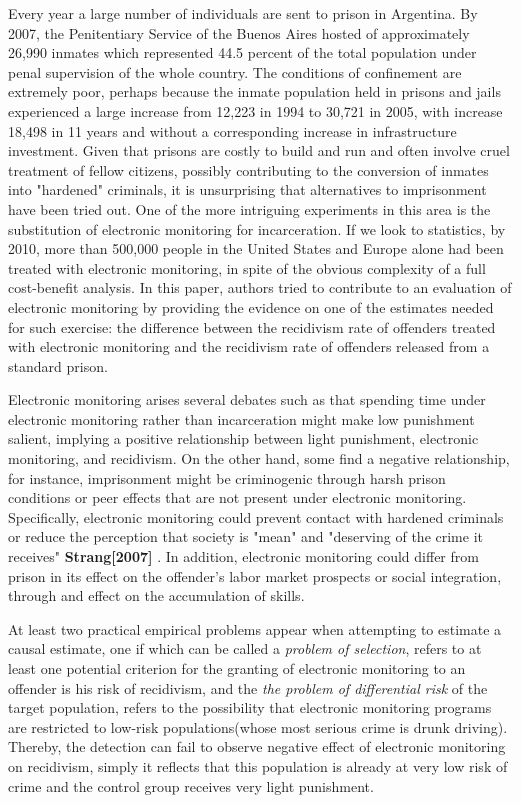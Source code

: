 \documentclass[a4paper,12pt]{article}
\begin{document}
Every year a large number of individuals are sent to prison in Argentina. By 2007, the Penitentiary Service of the Buenos Aires hosted of approximately 26,990 inmates which represented 44.5 percent of the total population under penal supervision of the whole country. The conditions of confinement are extremely poor, perhaps because the inmate population held in prisons and jails experienced a large increase from 12,223 in 1994 to 30,721 in 2005, with increase 18,498 in 11 years and without a corresponding increase in infrastructure investment. Given that prisons are costly to build and run and often involve cruel treatment of fellow citizens, possibly contributing to the conversion of inmates into "hardened" criminals, it is unsurprising that alternatives to imprisonment have been tried out. One of the more intriguing experiments in this area is the substitution of electronic monitoring for incarceration. If we look to statistics, by 2010, more than 500,000 people in the United States and Europe alone had been treated with electronic monitoring, in spite of the obvious complexity of a full cost-benefit analysis. In this paper, authors tried to contribute to an evaluation of electronic monitoring by providing the evidence on one of the estimates needed for such exercise: the difference between the recidivism rate of offenders treated with electronic monitoring and the recidivism rate of offenders released from a standard prison. 

Electronic monitoring arises several debates such as that spending time under electronic monitoring rather than incarceration might make low punishment salient, implying a positive relationship between light punishment, electronic monitoring, and recidivism. On the other hand, some find a negative relationship, for instance, imprisonment might be criminogenic through harsh prison conditions or peer effects that are not present under electronic monitoring. Specifically, electronic monitoring could prevent contact with hardened criminals or reduce the perception that society is "mean" and "deserving of the crime it receives" \textbf{Strang[2007]} \cite{article}. In addition, electronic monitoring could differ from prison in its effect on the offender's labor market prospects or social integration, through and effect on the accumulation of skills. 

At least two practical empirical problems appear when attempting to estimate a causal estimate, one if which can be called a \textit{problem of selection}, refers to at least one potential criterion for the granting of electronic monitoring to an offender is his risk of recidivism,  and the \textit{the problem of differential risk} of the target population, refers to the possibility that electronic monitoring programs are restricted to low-risk populations(whose most serious crime is drunk driving). Thereby, the detection can fail to observe negative effect of electronic monitoring on recidivism, simply it reflects that this population is already at very low risk of crime and the control group receives very light punishment.  
\end{document}
